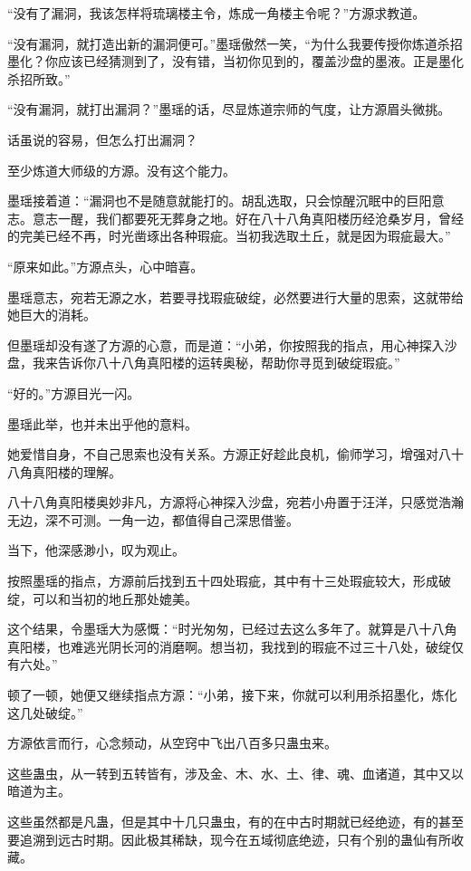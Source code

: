 \begin{this_body}
“没有了漏洞，我该怎样将琉璃楼主令，炼成一角楼主令呢？”方源求教道。

“没有漏洞，就打造出新的漏洞便可。”墨瑶傲然一笑，“为什么我要传授你炼道杀招墨化？你应该已经猜测到了，没有错，当初你见到的，覆盖沙盘的墨液。正是墨化杀招所致。”

“没有漏洞，就打出漏洞？”墨瑶的话，尽显炼道宗师的气度，让方源眉头微挑。

话虽说的容易，但怎么打出漏洞？

至少炼道大师级的方源。没有这个能力。

墨瑶接着道：“漏洞也不是随意就能打的。胡乱选取，只会惊醒沉眠中的巨阳意志。意志一醒，我们都要死无葬身之地。好在八十八角真阳楼历经沧桑岁月，曾经的完美已经不再，时光凿琢出各种瑕疵。当初我选取土丘，就是因为瑕疵最大。”

“原来如此。”方源点头，心中暗喜。

墨瑶意志，宛若无源之水，若要寻找瑕疵破绽，必然要进行大量的思索，这就带给她巨大的消耗。

但墨瑶却没有遂了方源的心意，而是道：“小弟，你按照我的指点，用心神探入沙盘，我来告诉你八十八角真阳楼的运转奥秘，帮助你寻觅到破绽瑕疵。”

“好的。”方源目光一闪。

墨瑶此举，也并未出乎他的意料。

她爱惜自身，不自己思索也没有关系。方源正好趁此良机，偷师学习，增强对八十八角真阳楼的理解。

八十八角真阳楼奥妙非凡，方源将心神探入沙盘，宛若小舟置于汪洋，只感觉浩瀚无边，深不可测。一角一边，都值得自己深思借鉴。

当下，他深感渺小，叹为观止。

按照墨瑶的指点，方源前后找到五十四处瑕疵，其中有十三处瑕疵较大，形成破绽，可以和当初的地丘那处媲美。

这个结果，令墨瑶大为感慨：“时光匆匆，已经过去这么多年了。就算是八十八角真阳楼，也难逃光阴长河的消磨啊。想当初，我找到的瑕疵不过三十八处，破绽仅有六处。”

顿了一顿，她便又继续指点方源：“小弟，接下来，你就可以利用杀招墨化，炼化这几处破绽。”

方源依言而行，心念频动，从空窍中飞出八百多只蛊虫来。

这些蛊虫，从一转到五转皆有，涉及金、木、水、土、律、魂、血诸道，其中又以暗道为主。

这些虽然都是凡蛊，但是其中十几只蛊虫，有的在中古时期就已经绝迹，有的甚至要追溯到远古时期。因此极其稀缺，现今在五域彻底绝迹，只有个别的蛊仙有所收藏。


\end{this_body}
